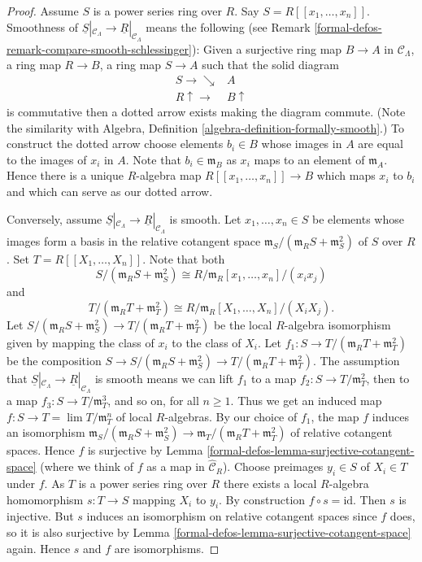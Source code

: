 \begin{proof}
Assume $S$ is a power series ring over $R$. Say $S = R[[x_1, \ldots, x_n]]$.
Smoothness of
$\underline{S}|_{\mathcal{C}_\Lambda} \to \underline{R}|_{\mathcal{C}_\Lambda}$
means the following (see Remark \ref{formal-defos-remark-compare-smooth-schlessinger}):
Given a surjective ring map $B \to A$ in
$\mathcal{C}_\Lambda$, a ring map $R \to B$, a ring map $S \to A$ such that
the solid diagram
$$
\begin{array}{cc}S \longrightarrow\searrow & A \\ R \uparrow\longrightarrow & B \uparrow\end{array}
$$
is commutative then a dotted arrow exists making the diagram commute.
(Note the similarity with
Algebra, Definition \ref{algebra-definition-formally-smooth}.)
To construct the dotted arrow choose elements $b_i \in B$ whose images
in $A$ are equal to the images of $x_i$ in $A$. Note that
$b_i \in \mathfrak m_B$ as $x_i$ maps to an element of $\mathfrak m_A$.
Hence there is a unique $R$-algebra map $R[[x_1, \ldots, x_n]] \to B$
which maps $x_i$ to $b_i$ and which can serve as our dotted arrow.

\medskip\noindent
Conversely, assume
$\underline{S}|_{\mathcal{C}_\Lambda} \to \underline{R}|_{\mathcal{C}_\Lambda}$
is smooth. Let $x_1, \ldots, x_n \in S$ be elements whose images
form a basis in the relative cotangent space
$\mathfrak m_S/(\mathfrak m_R S + \mathfrak m_S^2)$ of $S$ over $R$.
Set $T = R[[X_1, \ldots, X_n]]$. Note that both
$$
S/(\mathfrak m_R S + \mathfrak m_S^2) \cong
R/\mathfrak m_R[x_1, \ldots, x_n]/(x_ix_j)
$$
and
$$
T/(\mathfrak m_R T + \mathfrak m_T^2) \cong
R/\mathfrak m_R[X_1, \ldots, X_n]/(X_iX_j).
$$
Let
$S/(\mathfrak m_R S + \mathfrak m_S^2) \to
T/(\mathfrak m_R T + \mathfrak m_T^2)$
be the local $R$-algebra isomorphism given by mapping
the class of $x_i$ to the class of $X_i$. Let
$f_1 : S \to T/(\mathfrak m_R T + \mathfrak m_T^2)$ be the
composition
$S \to S/(\mathfrak m_R S + \mathfrak m_S^2)
\to T/(\mathfrak m_R T + \mathfrak m_T^2)$.
The assumption that
$\underline{S}|_{\mathcal{C}_\Lambda} \to \underline{R}|_{\mathcal{C}_\Lambda}$
is smooth means we can lift $f_1$ to a map
$f_2 : S \to T/\mathfrak{m}_T^2$, then to a map
$f_3 : S \to T/\mathfrak{m}_T^3$, and so on, for all $n \geq 1$. Thus
we get an induced map $f : S \to T = \lim T/\mathfrak m_T^n$
of local $R$-algebras. By our choice of $f_1$, the map $f$ induces an
isomorphism
$\mathfrak m_S/(\mathfrak m_R S + \mathfrak m_S^2) \to
\mathfrak m_T/(\mathfrak m_R T + \mathfrak m_T^2)$
of relative cotangent spaces.
Hence $f$ is surjective by
Lemma \ref{formal-defos-lemma-surjective-cotangent-space}
(where we think of $f$ as a map in $\widehat{\mathcal{C}}_R$).
Choose preimages $y_i \in S$ of $X_i \in T$ under $f$. As $T$ is a
power series ring over $R$ there exists a local
$R$-algebra homomorphism $s : T \to S$ mapping $X_i$ to $y_i$.
By construction $f \circ s = \text{id}$. Then $s$ is injective.
But $s$ induces an isomorphism on relative cotangent spaces since
$f$ does, so it is also surjective by
Lemma \ref{formal-defos-lemma-surjective-cotangent-space}
again. Hence $s$ and $f$ are isomorphisms.
\end{proof}

